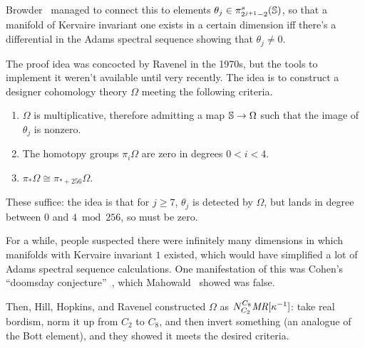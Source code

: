 Browder~\cite{Browder} managed to connect this to elements $\theta_j\in\pi_{2^{j+1}-2}^s(\mathbb S)$, so that a manifold
of Kervaire invariant one exists in a certain dimension iff there's a differential in the Adams spectral sequence
showing that $\theta_j\ne 0$.

The proof idea was concocted by Ravenel in the 1970s, but the tools to implement it weren't available until very
recently. The idea is to construct a designer cohomology theory $\Omega$ meeting the following criteria.
\begin{enumerate}
	\item $\Omega$ is multiplicative, therefore admitting a map $\mathbb S\to\Omega$ such that the image of $\theta_j$
	is nonzero.
	\item The homotopy groups $\pi_i\Omega$ are zero in degrees $0 < i < 4$.
	\item $\pi_*\Omega\cong\pi_{*+256}\Omega$.
\end{enumerate}
These suffice: the idea is that for $j\ge 7$, $\theta_j$ is detected by $\Omega$, but lands in degree between $0$
and $4\bmod 256$, so must be zero.
\begin{rem}
For a while, people suspected there were infinitely many dimensions in which manifolds with Kervaire invariant $1$
existed, which would have simplified a lot of Adams spectral sequence calculations. One manifestation of this was
Cohen's ``doomsday conjecture''~\cite{Doomsday}, which Mahowald~\cite{NoDoomsday} showed was false.
\end{rem}
Then, Hill, Hopkins, and Ravenel constructed $\Omega$ as $N_{C_2}^{C_8}\mathit{MR}[\kappa^{-1}]$: take real bordism, norm
it up from $C_2$ to $C_8$, and then invert something (an analogue of the Bott element), and they showed it meets
the desired criteria.
